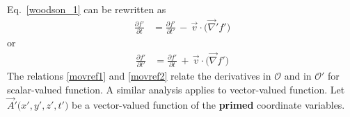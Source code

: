 \documentclass[12pt,a4paper,oneside]{book}
\begin{document}
\begin{onehalfspace}
Eq.~\ref{woodson_1} can be rewritten as 
\begin{equation}\label{movref1}
	\begin{aligned}
		\frac{\partial f'}{\partial t} &= \frac{\partial f'}{\partial 
		t'}\,-\,\vec{v}\cdot\big(\vec{\nabla}'f'\big)
	\end{aligned}
\end{equation} 
or
\begin{equation}\label{movref2}
	\begin{aligned}
		\frac{\partial f'}{\partial t'} &= \frac{\partial f'}{\partial 
		t}\,+\,\vec{v}\cdot\big(\vec{\nabla}f'\big)
	\end{aligned}
\end{equation} 
The relations \ref{movref1} and \ref{movref2} relate the derivatives in 
$\mathcal{O}$ and in $\mathcal{O'}$ for scalar-valued function. A similar 
analysis applies to vector-valued function. Let $\vec{A}'\big(x',y',z',t'\big)$ 
be a vector-valued function of the \textbf{primed} coordinate variables. 


\end{onehalfspace}
\end{document}
